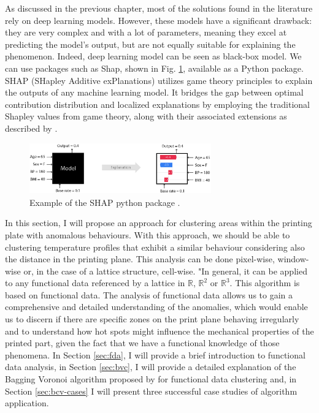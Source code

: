 As discussed in the previous chapter, most of the solutions found in the literature rely on deep learning models. However, these models have a significant drawback: they are very complex and with a lot of parameters, meaning they excel at predicting the model's output, but are not equally suitable for explaining the phenomenon. Indeed, deep learning model can be seen as black-box model. We can use packages such as Shap, shown in Fig. \ref{fig:shap}, available as a Python package. SHAP (SHapley Additive exPlanations) utilizes game theory principles to explain the outputs of any machine learning model. It bridges the gap between optimal contribution distribution and localized explanations by employing the traditional Shapley values from game theory, along with their associated extensions as described by \citeauthor{}.
\begin{figure}
    \centering
    \includegraphics[width=0.7\textwidth]{Images/shap.png}
    \caption[SHAP python package.]{Example of the SHAP python package \cite{noauthor_shap_nodate}.}
    \label{fig:shap}
\end{figure}

In this section, I will propose an approach for clustering areas within the printing plate with anomalous behaviours. With this approach, we should be able to clustering temperature profiles that exhibit a similar behaviour considering also the distance in the printing plane. This analysis can be done pixel-wise, window-wise or, in the case of a lattice structure, cell-wise. "In general, it can be applied to any functional data referenced by a lattice in $\mathbb{R}$, $\mathbb{R}^2$ or $\mathbb{R}^3$. This algorithm is based on functional data. The analysis of functional data allows us to gain a comprehensive and detailed understanding of the anomalies, which would enable us to discern if there are specific zones on the print plane behaving irregularly and to understand how hot spots might influence the mechanical properties of the printed part, given the fact that we have a functional knowledge of those phenomena. In Section \ref{sec:fda}, I will provide a brief introduction to functional data analysis, in Section \ref{sec:bvc}, I will provide a detailed explanation of the Bagging Voronoi algorithm proposed by \citeauthor{secchi_bagging_2013} for functional data clustering and, in Section \ref{sec:bcv-cases} I will present three successful case studies of algorithm application.

